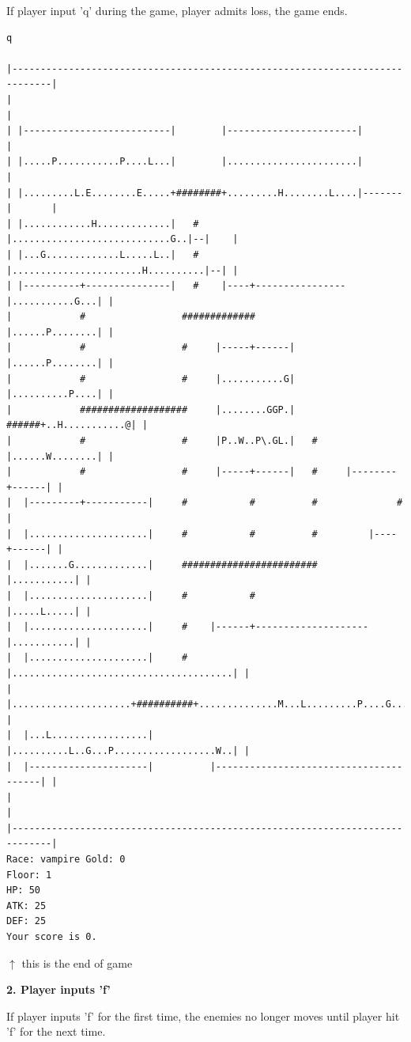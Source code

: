 \documentclass[11pt]{article}
\theoremstyle{plain}
\begin{document}
If player input 'q' during the game, player admits loss, the game ends.
\begin{Verbatim}[fontsize=\scriptsize]
q

|-----------------------------------------------------------------------------|
|                                                                             |
| |--------------------------|        |-----------------------|               |
| |.....P...........P....L...|        |.......................|               |
| |.........L.E........E.....+########+.........H........L....|-------|       |
| |............H.............|   #    |............................G..|--|    |
| |...G.............L.....L..|   #    |.......................H..........|--| |
| |----------+---------------|   #    |----+----------------|...........G...| |
|            #                 #############                |......P........| |
|            #                 #     |-----+------|         |......P........| |
|            #                 #     |...........G|         |..........P....| |
|            ###################     |........GGP.|   ######+..H...........@| |
|            #                 #     |P..W..P\.GL.|   #     |......W........| |
|            #                 #     |-----+------|   #     |--------+------| |
|  |---------+-----------|     #           #          #              #        |
|  |.....................|     #           #          #         |----+------| |
|  |.......G.............|     ########################         |...........| |
|  |.....................|     #           #                    |.....L.....| |
|  |.....................|     #    |------+--------------------|...........| |
|  |.....................|     #    |.......................................| |
|  |.....................+##########+..............M...L.........P....G.....| |
|  |...L.................|          |..........L..G...P..................W..| |
|  |---------------------|          |---------------------------------------| |
|                                                                             |
|-----------------------------------------------------------------------------|
Race: vampire Gold: 0                                                  Floor: 1
HP: 50
ATK: 25
DEF: 25
Your score is 0. 
\end{Verbatim}
$\uparrow$ this is the end of game




\newpage
\textbf{2. Player inputs 'f'}

If player inputs 'f' for the first time, the enemies no longer moves
until player hit 'f' for the next time.\\\\
\end{document}
